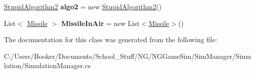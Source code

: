 \begin{DoxyCompactItemize}
\item 
\mbox{\label{class_n_g_sim_1_1_simulation_1_1_simulation_manager_aae68d5fd3b7d3d25062a16d536b27af4}} 
\hyperlink{class_n_g_sim_1_1_stupid_algorithm2}{Stupid\+Algorithm2} {\bfseries algo2} = new \hyperlink{class_n_g_sim_1_1_stupid_algorithm2}{Stupid\+Algorithm2}()
\item 
\mbox{\label{class_n_g_sim_1_1_simulation_1_1_simulation_manager_a4e7054f9038e9616d5810c633cb212db}} 
List$<$ \hyperlink{struct_n_g_a_p_i_1_1_missile}{Missile} $>$ {\bfseries Missile\+In\+Air} = new List$<$\hyperlink{struct_n_g_a_p_i_1_1_missile}{Missile}$>$()
\end{DoxyCompactItemize}


The documentation for this class was generated from the following file\+:\begin{DoxyCompactItemize}
\item 
C\+:/\+Users/\+Booker/\+Documents/\+School\+\_\+\+Stuff/\+N\+G/\+N\+G\+Game\+Sim/\+Sim\+Manager/\+Simulation/Simulation\+Manager.\+cs\end{DoxyCompactItemize}
